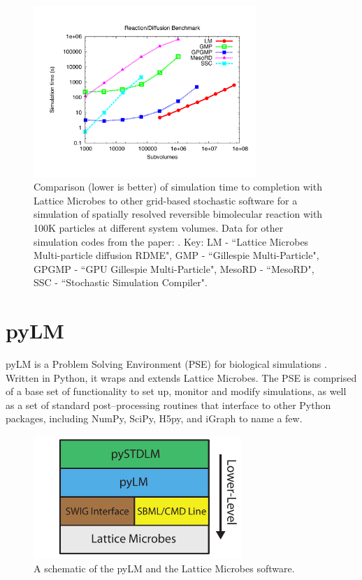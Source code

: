 \begin{figure}[h!]
  \centering
      \includegraphics[width=0.75\textwidth]{Figures/SoftwareBenchmark.pdf}
  \caption{Comparison (lower is better) of simulation time to completion with Lattice Microbes  to other grid-based stochastic software for a simulation of spatially resolved reversible bimolecular reaction with 100K particles at different system volumes.  Data for other simulation codes from the paper: \cite{Vigelius2010ard}. Key: LM - ``Lattice Microbes Multi-particle diffusion RDME",  GMP - ``Gillespie Multi-Particle", GPGMP - ``GPU Gillespie Multi-Particle", MesoRD - ``MesoRD", SSC - ``Stochastic Simulation Compiler".} \label{fig:timings}
\end{figure}


\section{pyLM}
pyLM is a Problem Solving Environment (PSE) for biological simulations \cite{Peterson2013aps}.  Written in Python, it wraps and extends Lattice Microbes.  The PSE is comprised of a base set of functionality to set up, monitor and modify simulations, as well as a set of standard post--processing routines that interface to other Python packages, including NumPy, SciPy, H5py, and iGraph to name a few.  \\

\begin{figure}[h!]
  \centering
      \includegraphics[width=0.7\textwidth]{Figures/Schematic.pdf}
  \caption{A schematic of the pyLM and the Lattice Microbes software.} \label{fig:pyschematic}
\end{figure}

